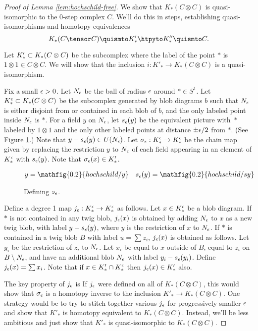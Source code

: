 \begin{proof}[Proof of Lemma \ref{lem:hochschild-free}]
We show that $K_*(C\otimes C)$ is
quasi-isomorphic to the 0-step complex $C$. We'll do this in steps, establishing quasi-isomorphisms and homotopy equivalences
$$K_*(C \tensor C) \quismto K'_* \htpyto K''_* \quismto C.$$

Let $K'_* \subset K_*(C\otimes C)$ be the subcomplex where the label of
the point $*$ is $1 \otimes 1 \in C\otimes C$.
We will show that the inclusion $i: K'_* \to K_*(C\otimes C)$ is a quasi-isomorphism.

Fix a small $\epsilon > 0$.
Let $N_\epsilon$ be the ball of radius $\epsilon$ around $* \in S^1$.
Let $K_*^\epsilon \subset K_*(C\otimes C)$ be the subcomplex
generated by blob diagrams $b$ such that $N_\epsilon$ is either disjoint from
or contained in each blob of $b$, and the only labeled point inside $N_\epsilon$ is $*$.
For a field $y$ on $N_\epsilon$, let $s_\epsilon(y)$ be the equivalent picture with~$*$
labeled by $1\otimes 1$ and the only other labeled points at distance $\pm\epsilon/2$ from $*$.
(See Figure \ref{fig:sy}.) Note that $y - s_\epsilon(y) \in U(N_\epsilon)$. 
Let $\sigma_\epsilon: K_*^\epsilon \to K_*^\epsilon$ be the chain map
given by replacing the restriction $y$ to $N_\epsilon$ of each field
appearing in an element of  $K_*^\epsilon$ with $s_\epsilon(y)$.
Note that $\sigma_\epsilon(x) \in K'_*$.
\begin{figure}[t]
\begin{align*}
y & = \mathfig{0.2}{hochschild/y} &
s_\ep(y) & = \mathfig{0.2}{hochschild/sy}
\end{align*}
\caption{Defining $s_\epsilon$.}
\label{fig:sy}
\end{figure}

Define a degree 1 map $j_\epsilon : K_*^\epsilon \to K_*^\epsilon$ as follows.
Let $x \in K_*^\epsilon$ be a blob diagram.
If $*$ is not contained in any twig blob, $j_\epsilon(x)$ is obtained by adding $N_\epsilon$ to
$x$ as a new twig blob, with label $y - s_\epsilon(y)$, where $y$ is the restriction of $x$ to $N_\epsilon$.
If $*$ is contained in a twig blob $B$ with label $u = \sum z_i$, $j_\epsilon(x)$ is obtained as follows.
Let $y_i$ be the restriction of $z_i$ to $N_\epsilon$.
Let $x_i$ be equal to $x$ outside of $B$, equal to $z_i$ on $B \setminus N_\epsilon$,
and have an additional blob $N_\epsilon$ with label $y_i - s_\epsilon(y_i)$.
Define $j_\epsilon(x) = \sum x_i$.
Note that if $x \in K'_* \cap K_*^\epsilon$ then $j_\epsilon(x) \in K'_*$ also.

The key property of $j_\epsilon$ is
If $j_\epsilon$ were defined on all of $K_*(C\otimes C)$, this would show that $\sigma_\epsilon$
is a homotopy inverse to the inclusion $K'_* \to K_*(C\otimes C)$.
One strategy would be to try to stitch together various $j_\epsilon$ for progressively smaller
$\epsilon$ and show that $K'_*$ is homotopy equivalent to $K_*(C\otimes C)$.
Instead, we'll be less ambitious and just show that
$K'_*$ is quasi-isomorphic to $K_*(C\otimes C)$.


\end{proof}
